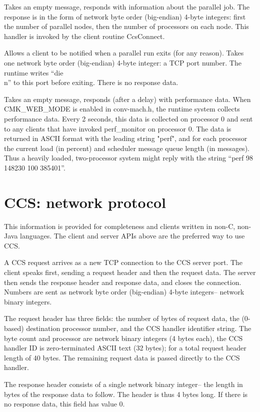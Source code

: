 Takes an empty message, responds with information about the parallel
job.  The response is in the form of network byte order (big-endian) 4-byte 
integers: first the number of parallel nodes, then the number of processors
on each node.  This handler is invoked by the client routine CcsConnect.

Allows a client to be notified when a parallel run exits (for any reason).
Takes one network byte order (big-endian) 4-byte integer: a TCP port
number. The runtime writes ``die\\n'' to this port before exiting.
There is no response data.

Takes an empty message, responds (after a delay) with performance data.
When CMK\_WEB\_MODE is enabled in conv-mach.h, the runtime system collects
performance data.  Every 2 seconds, this data is collected on processor
0 and sent to any clients that have invoked perf\_monitor on processor 0.
The data is returned in ASCII format with the leading string "perf", 
and for each processor the current load (in percent) and scheduler message
queue length (in messages).  Thus a heavily loaded, two-processor system
might reply with the string ``perf 98 148230 100 385401''.


\section{CCS: network protocol}
This information is provided for completeness and clients written
in non-C, non-Java languages.  The client and server APIs above are
the preferred way to use CCS.

A CCS request arrives as a new TCP connection to the CCS server port.
The client speaks first, sending a request header and then the request
data.  The server then sends the response header and response data,
and closes the connection.  Numbers are sent as network byte order
(big-endian) 4-byte integers-- network binary integers.

The request header has three fields: the number of bytes of request data,
the (0-based) destination processor number, and the CCS handler identifier
string.  The byte count and processor are network binary integers (4 bytes
each), the CCS handler ID is zero-terminated ASCII text (32 bytes); for
a total request header length of 40 bytes.  The remaining request data
is passed directly to the CCS handler.

The response header consists of a single network binary integer-- the 
length in bytes of the response data to follow.  The header is thus 4 
bytes long.  If there is no response data, this field has value 0.


